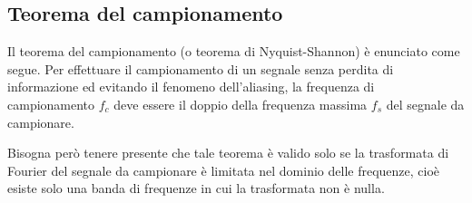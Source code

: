 \subsection{Teorema del campionamento}

Il teorema del campionamento (o teorema di Nyquist-Shannon) è enunciato come segue. Per effettuare il campionamento di un segnale senza perdita di informazione ed evitando il fenomeno dell'aliasing, la frequenza di campionamento $f_c$ deve essere il doppio della frequenza massima $f_s$ del segnale da campionare.

Bisogna però tenere presente che tale teorema è valido solo se la trasformata di Fourier del segnale da campionare è limitata nel dominio delle frequenze, cioè esiste solo una banda di frequenze in cui la trasformata non è nulla.